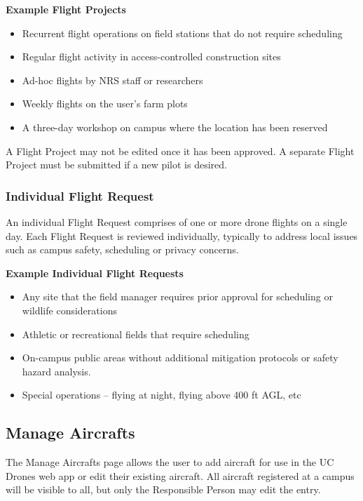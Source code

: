 \documentclass[
  12pt,
]{book}
\providecommand{\tightlist}{%
  \setlength{\itemsep}{0pt}\setlength{\parskip}{0pt}}
\begin{document}
\textbf{Example Flight Projects}

\begin{itemize}
\tightlist
\item
  Recurrent flight operations on field stations that do not require scheduling
\item
  Regular flight activity in access-controlled construction sites
\item
  Ad-hoc flights by NRS staff or researchers
\item
  Weekly flights on the user's farm plots
\item
  A three-day workshop on campus where the location has been reserved
\end{itemize}

A Flight Project may not be edited once it has been approved. A separate Flight Project must be submitted if a new pilot is desired.

\hypertarget{individual-flight-request}{%
\subsubsection{Individual Flight Request}\label{individual-flight-request}}

An individual Flight Request comprises of one or more drone flights on a single day. Each Flight Request is reviewed individually, typically to address local issues such as campus safety, scheduling or privacy concerns.

\textbf{Example Individual Flight Requests}

\begin{itemize}
\tightlist
\item
  Any site that the field manager requires prior approval for scheduling or wildlife considerations
\item
  Athletic or recreational fields that require scheduling
\item
  On-campus public areas without additional mitigation protocols or safety hazard analysis.
\item
  Special operations -- flying at night, flying above 400 ft AGL, etc
\end{itemize}

\hypertarget{manage-aircrafts}{%
\subsection{Manage Aircrafts}\label{manage-aircrafts}}

The Manage Aircrafts page allows the user to add aircraft for use in the UC Drones web app or edit their existing aircraft. All aircraft registered at a campus will be visible to all, but only the Responsible Person may edit the entry.
\end{document}
